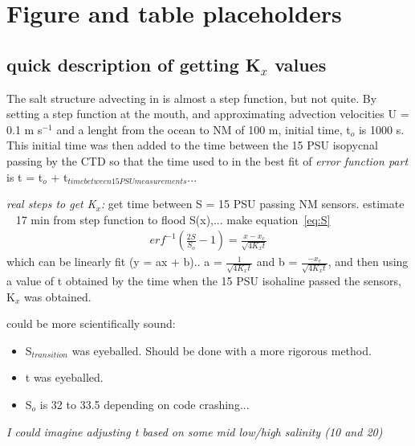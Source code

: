 \section{Figure and table placeholders}



\subsection{quick description of getting K$_x$ values}
The salt structure advecting in is almost a step function, but not quite. By setting a step function at the mouth, and approximating advection velocities U = 0.1 m s$^{-1}$ and a lenght from the ocean to NM of 100 m, initial time, t$_o$ is 1000 s. This initial time was then added to the time between the 15 PSU isopycnal passing by the CTD so that the time used to in the best fit of \emph{error function part} is t = t$_o$ + t$_{time between 15 PSU measurements}$... 

\emph{real steps to get K$_x$:} get time between S = 15 PSU passing NM sensors.  estimate ~ 17 min from step function to flood S(x),... make equation~\ref{eq:S} 
\begin{eqnarray}
erf^{-1}(\frac{2S}{S_o}-1) = \frac{x-x_c}{\sqrt{4K_xt}} \label{eq:linfitS}
\end{eqnarray}
which can be linearly fit (y = ax + b).. a = $\frac{1}{\sqrt{4K_xt}}$ and b = $\frac{-x_c}{\sqrt{4K_xt}}$, and then using a value of t obtained by the time when the 15 PSU isohaline passed the sensors, K$_x$ was obtained.  



could be more scientifically sound:
\begin{itemize}
	\item S$_{transition}$ was eyeballed. Should be done with a more rigorous method. 
	\item t was eyeballed.
	\item S$_o$ is 32 to 33.5 depending on code crashing... 
\end{itemize}

\emph{I could imagine adjusting t based on some mid low/high salinity (10 and 20)}

\renewcommand{\arraystretch}{1.3}

